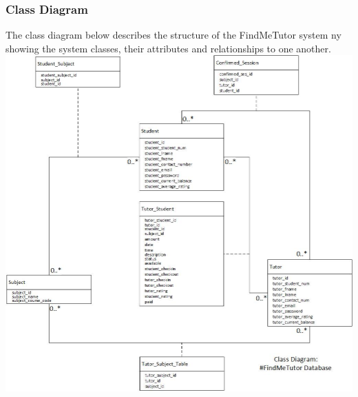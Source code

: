 \documentclass[12pt]{article}
\begin{document}
\subsubsection{Class Diagram}
The class diagram below describes the structure of the FindMeTutor system ny showing the system classes, their attributes and relationships to one another.\\
\includegraphics[width=140mm]{./class_diagram_findme_tutor.jpg}

\newpage
\end{document}
